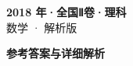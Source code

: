 \documentclass[zihao=-4, a4paper]{ctexart}
\begin{document}
\begin{center}
  {\Large\bfseries 2018 年·全国Ⅱ卷·理科}\\[4pt]
  {\large 数学 · 解析版}
\end{center}
\medskip
{}

\clearpage
{}
\begin{center}{\Large\bfseries 参考答案与详细解析}\end{center}
\medskip

\end{document}
